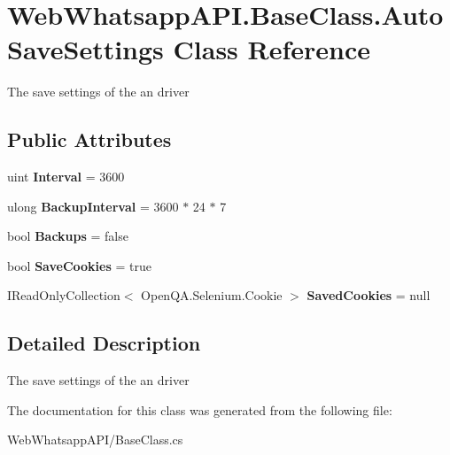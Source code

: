 \hypertarget{class_web_whatsapp_a_p_i_1_1_base_class_1_1_auto_save_settings}{}\section{Web\+Whatsapp\+A\+P\+I.\+Base\+Class.\+Auto\+Save\+Settings Class Reference}
\label{class_web_whatsapp_a_p_i_1_1_base_class_1_1_auto_save_settings}


The save settings of the an driver  


\subsection*{Public Attributes}
\begin{DoxyCompactItemize}
\item 
\mbox{\label{class_web_whatsapp_a_p_i_1_1_base_class_1_1_auto_save_settings_ae75a7de110ce739944922a193cfa9450}} 
uint {\bfseries Interval} = 3600
\item 
\mbox{\label{class_web_whatsapp_a_p_i_1_1_base_class_1_1_auto_save_settings_affe2035c257c5f227a100a8801423c45}} 
ulong {\bfseries Backup\+Interval} = 3600 $\ast$ 24 $\ast$ 7
\item 
\mbox{\label{class_web_whatsapp_a_p_i_1_1_base_class_1_1_auto_save_settings_a1f503c29c15ed81a54acae3c98019a3c}} 
bool {\bfseries Backups} = false
\item 
\mbox{\label{class_web_whatsapp_a_p_i_1_1_base_class_1_1_auto_save_settings_a74ad61f5d58f035ea36cda15518597a7}} 
bool {\bfseries Save\+Cookies} = true
\item 
\mbox{\label{class_web_whatsapp_a_p_i_1_1_base_class_1_1_auto_save_settings_a3011d9cefa0a0865b545482bb1616f48}} 
I\+Read\+Only\+Collection$<$ Open\+Q\+A.\+Selenium.\+Cookie $>$ {\bfseries Saved\+Cookies} = null
\end{DoxyCompactItemize}


\subsection{Detailed Description}
The save settings of the an driver 



The documentation for this class was generated from the following file\+:\begin{DoxyCompactItemize}
\item 
Web\+Whatsapp\+A\+P\+I/Base\+Class.\+cs\end{DoxyCompactItemize}
